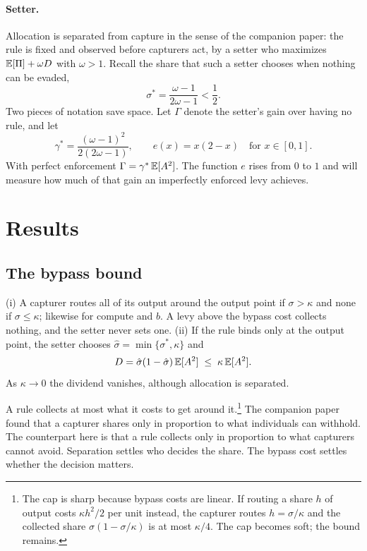 \paragraph{Setter.} Allocation is separated from capture in the sense of the companion
paper: the rule is fixed and observed before capturers act, by a setter who maximizes
$\mathbb{E}[\Pi]+\omega D$ with $\omega>1$. Recall the share that such a setter chooses when
nothing can be evaded,
\begin{equation}
  \sigma^*=\frac{\omega-1}{2\omega-1}<\frac12 .
\end{equation}
Two pieces of notation save space. Let $\Gamma$ denote the setter's gain over having no
rule, and let
\begin{equation}
  \gamma^*=\frac{(\omega-1)^2}{2(2\omega-1)}, \qquad e(x)=x(2-x)\quad\text{for }x\in[0,1].
\end{equation}
With perfect enforcement $\Gamma=\gamma^*\,\mathbb{E}[A^2]$. The function $e$ rises from $0$ to
$1$ and will measure how much of that gain an imperfectly enforced levy achieves.

\section{Results}

\subsection{The bypass bound}

\begin{proposition}\label{prop:bound}
(i) A capturer routes all of its output around the output point if $\sigma>\kappa$ and
none if $\sigma\le\kappa$; likewise for compute and $b$. A levy above the bypass cost
collects nothing, and the setter never sets one. (ii) If the rule binds only at the
output point, the setter chooses $\hat\sigma=\min\{\sigma^*,\kappa\}$ and
\begin{equation}
  D=\hat\sigma(1-\hat\sigma)\,\mathbb{E}[A^2]\;\le\;\kappa\,\mathbb{E}[A^2].
\end{equation}
As $\kappa\to 0$ the dividend vanishes, although allocation is separated.
\end{proposition}

A rule collects at most what it costs to get around it.\footnote{The cap is sharp because
bypass costs are linear. If routing a share $h$ of output costs $\kappa h^2/2$ per unit
instead, the capturer routes $h=\sigma/\kappa$ and the collected share
$\sigma(1-\sigma/\kappa)$ is at most $\kappa/4$. The cap becomes soft; the bound
remains.} The companion paper found that a capturer shares only in proportion to what
individuals can withhold. The counterpart here is that a rule collects only in proportion
to what capturers cannot avoid. Separation settles who decides the share. The bypass cost
settles whether the decision matters.

